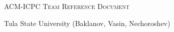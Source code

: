 \documentclass[a4paper]{article}
\begin{document}
\thispagestyle{fancy}

\begin{center}
	\Huge\textsc{ACM-ICPC Team Reference Document}

	\huge Tula State University (Baklanov, Vasin, Nechoroshev)

	\vspace{0.50cm}
\end{center}

\begin{multicols*}{2}
    \tableofcontents

    \setcounter{page}{1}
    
\end{multicols*}



%
%	
\end{document}
